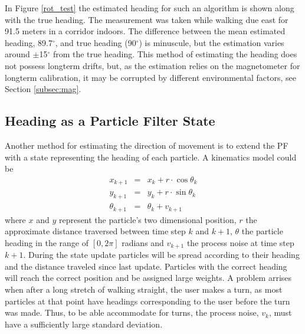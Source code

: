 \documentclass{LTHthesis}
\begin{document}
In Figure \ref{rot_test} the estimated heading for such an algorithm is shown along with the true heading. The measurement was taken while walking due east for 91.5 meters in a corridor indoors. The difference between the mean estimated heading, 89.7$^\circ$, and true heading (90$^\circ$) is minuscule, but the estimation varies around $\pm$15$^\circ$ from the true heading. This method of estimating the heading does not possess longterm drifts, but, as the estimation relies on the magnetometer for longterm calibration, it may be corrupted by different environmental factors, see Section \ref{subsec:mag}. 
%
\subsection{Heading as a Particle Filter State}
\label{subsec:PF_heading}
%
Another method for estimating the direction of movement is to extend the PF with a state representing the heading of each particle. A kinematics model could be
%
\begin{eqnarray}
x_{k+1} &  = & x_k + r\cdot\cos{\theta_k} \nonumber\\
y_{k+1} & = &y_k + r\cdot\sin{\theta_k}\label{eq:heading_kin_mod}\\
\theta_{k+1} & = & \theta_k + v_{k+1} \nonumber
\end{eqnarray}
%
where $x$ and $y$ represent the particle's two dimensional position, $r$ the approximate distance traversed between time step $k$ and $k+1$, $\theta$ the particle heading in the range of $\left[0,2\pi\right]$ radians and $v_{k+1}$ the process noise at time step $k+1$. During the state update particles will be spread according to their heading and the distance traveled since last update. Particles with the correct heading will reach the correct position and be assigned large weights. A problem arrises when after a long stretch of walking straight, the user makes a turn, as most particles at that point have headings corresponding to the user before the turn was made. Thus, to be able accommodate for turns, the process noise, $v_k$, must have a sufficiently large standard deviation. 
\end{document}
